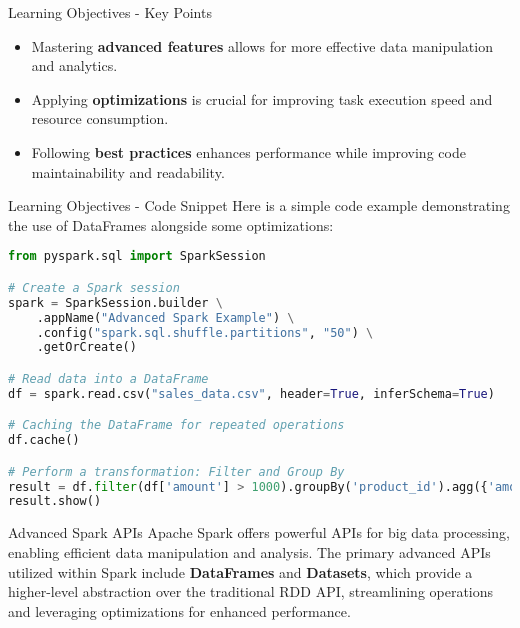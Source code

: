 \documentclass[aspectratio=169]{beamer}
\begin{document}
\begin{frame}[fragile]{Learning Objectives - Key Points}
    \begin{itemize}
        \item Mastering \textbf{advanced features} allows for more effective data manipulation and analytics.
        \item Applying \textbf{optimizations} is crucial for improving task execution speed and resource consumption.
        \item Following \textbf{best practices} enhances performance while improving code maintainability and readability.
    \end{itemize}
\end{frame}

\begin{frame}[fragile]{Learning Objectives - Code Snippet}
    Here is a simple code example demonstrating the use of DataFrames alongside some optimizations:
    \begin{lstlisting}[language=python]
from pyspark.sql import SparkSession

# Create a Spark session
spark = SparkSession.builder \
    .appName("Advanced Spark Example") \
    .config("spark.sql.shuffle.partitions", "50") \
    .getOrCreate()

# Read data into a DataFrame
df = spark.read.csv("sales_data.csv", header=True, inferSchema=True)

# Caching the DataFrame for repeated operations
df.cache()

# Perform a transformation: Filter and Group By
result = df.filter(df['amount'] > 1000).groupBy('product_id').agg({'amount': 'sum'})
result.show()
    \end{lstlisting}
\end{frame}

\begin{frame}[fragile]{Advanced Spark APIs}
    Apache Spark offers powerful APIs for big data processing, enabling efficient data manipulation and analysis. The primary advanced APIs utilized within Spark include \textbf{DataFrames} and \textbf{Datasets}, which provide a higher-level abstraction over the traditional RDD API, streamlining operations and leveraging optimizations for enhanced performance.
\end{frame}
\end{document}
